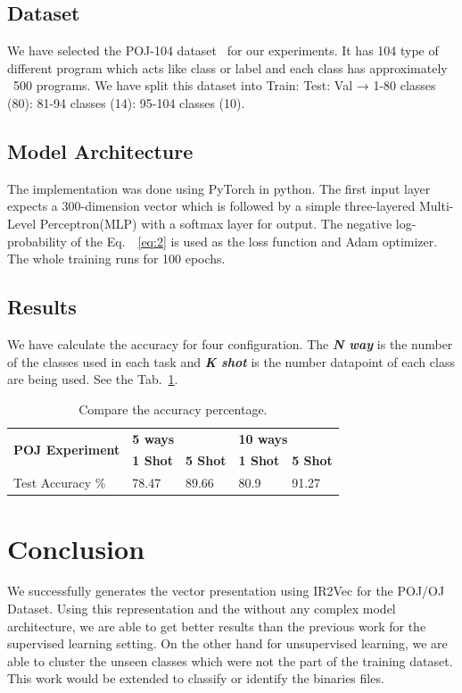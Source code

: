 \subsection{Dataset}
We have selected the POJ-104 dataset~\cite{tbcnn-aaai16} for our experiments. It has 104 type of different program which acts like class or label and each class has approximately ~500 programs. We have split this dataset into Train: Test: Val →  1-80 classes (80): 81-94 classes (14): 95-104 classes (10).

\subsection{Model Architecture}
The implementation was done using PyTorch in python. The first input layer expects a 300-dimension vector which is followed by a simple three-layered Multi-Level Perceptron(MLP) with a softmax layer for output. The negative log-probability of the Eq.~~\ref{eq:2} is used as the loss function and Adam optimizer. The whole training runs for 100 epochs.

\subsection{Results}
We have calculate the accuracy for four configuration. The \textit{\textbf{N way}} is the number of the classes used in each task and \textit{\textbf{K shot}} is the number datapoint  of each class are being used. See the Tab.~\ref{tab:unsupervised-acc}.
\begin{table}[h]
\begin{tabular}{lllll}
\hline
\multirow{2}{*}{\textbf{POJ Experiment}} & \multicolumn{2}{l}{\textbf{5 ways}} & \multicolumn{2}{l}{\textbf{10 ways}} \\
 & \textbf{1 Shot} & \textbf{5 Shot} & \textbf{1 Shot} & \textbf{5 Shot} \\
\hline
Test Accuracy \% & 78.47 & 89.66 & 80.9 & 91.27 \\
\hline
\end{tabular}
\centering
\caption{Compare the accuracy percentage.}
\label{tab:unsupervised-acc}
\end{table}



\section{Conclusion}\label{sec:algo:conclusion}
We successfully generates the vector presentation using IR2Vec for the POJ/OJ Dataset. Using this representation and the without any complex model architecture, we are able to get better results than the previous work for the supervised learning setting. On the other hand for unsupervised learning, we are  able to cluster the unseen classes which were not the part of the training dataset.
This work would be extended to classify or identify the binaries files.